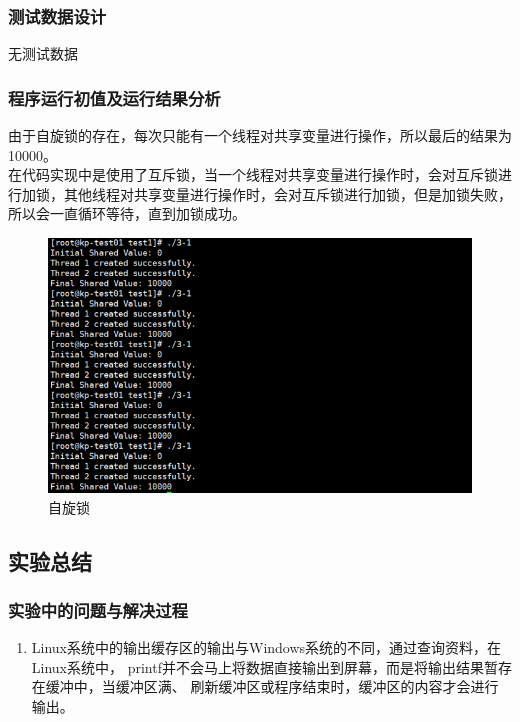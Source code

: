 \documentclass{article}
\begin{document}
    \subsubsection{测试数据设计}

    无测试数据

    \subsubsection{程序运行初值及运行结果分析}
    由于自旋锁的存在，每次只能有一个线程对共享变量进行操作，所以最后的结果为10000。\\
    在代码实现中是使用了互斥锁，当一个线程对共享变量进行操作时，会对互斥锁进行加锁，其他线程对共享变量进行操作时，会对互斥锁进行加锁，但是加锁失败，所以会一直循环等待，直到加锁成功。\\
        \begin{figure}[htbp]
            \centering
            \includegraphics[scale=0.6]{picture/12.png}
            \caption{自旋锁}
            \label{12}
        \end{figure}

    \subsection{实验总结}
    \subsubsection{实验中的问题与解决过程}
    \begin{enumerate}
        \item Linux系统中的输出缓存区的输出与Windows系统的不同，通过查询资料，在Linux系统中，
        printf并不会马上将数据直接输出到屏幕，而是将输出结果暂存在缓冲中，当缓冲区满、
        刷新缓冲区或程序结束时，缓冲区的内容才会进行输出。
    \end{enumerate} 
\end{document}
